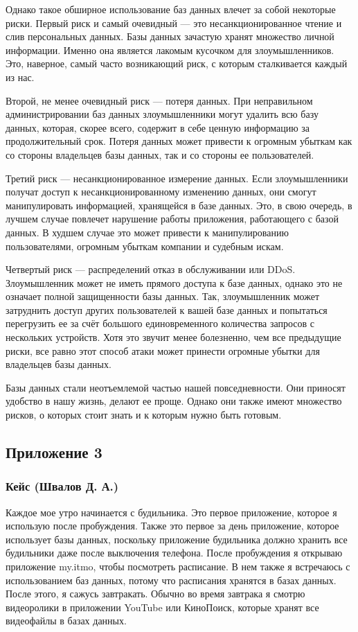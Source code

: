 \documentclass[a4paper,14pt]{extarticle}
\begin{document}
Однако такое обширное использование баз данных влечет за собой некоторые риски. Первый риск и самый очевидный — это несанкционированное чтение и слив персональных данных. Базы данных зачастую хранят множество личной информации. Именно она является лакомым кусочком для злоумышленников. Это, наверное, самый часто возникающий риск, с которым сталкивается каждый из нас.

Второй, не менее очевидный риск — потеря данных. При неправильном администрировании баз данных злоумышленники могут удалить всю базу данных, которая, скорее всего, содержит в себе ценную информацию за продолжительный срок. Потеря данных может привести к огромным убыткам как со стороны владельцев базы данных, так и со стороны ее пользователей.

Третий риск — несанкционированное измерение данных. Если злоумышленники получат доступ к несанкционированному изменению данных, они смогут манипулировать информацией, хранящейся в базе данных. Это, в свою очередь, в лучшем случае повлечет нарушение работы приложения, работающего с базой данных. В худшем случае это может привести к манипулированию пользователями, огромным убыткам компании и судебным искам.

Четвертый риск — распределений отказ в обслуживании или DDoS. Злоумышленник может не иметь прямого доступа к базе данных, однако это не означает полной защищенности базы данных. Так, злоумышленник может затруднить доступ других пользователей к вашей базе данных и попытаться перегрузить ее за счёт большого единовременного количества запросов с нескольких устройств. Хотя это звучит менее болезненно, чем все предыдущие риски, все равно этот способ атаки может принести огромные убытки для владельцев базы данных.

Базы данных стали неотъемлемой частью нашей повседневности. Они приносят удобство в нашу жизнь, делают ее проще. Однако они также имеют множество рисков, о которых стоит знать и к которым нужно быть готовым.

\newpage

\subsection*{\hfill Приложение 3}

\subsubsection*{\centering Кейс (Швалов Д. А.)}

Каждое мое утро начинается с будильника. Это первое приложение, которое я использую после пробуждения. Также это первое за день приложение, которое использует базы данных, поскольку приложение будильника должно хранить все будильники даже после выключения телефона. После пробуждения я открываю приложение my.itmo, чтобы посмотреть расписание. В нем также я встречаюсь с использованием баз данных, потому что расписания хранятся в базах данных. После этого, я сажусь завтракать. Обычно во время завтрака я смотрю видеоролики в приложении YouTube или КиноПоиск, которые хранят все видеофайлы в базах данных.
\end{document}
